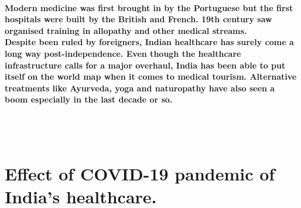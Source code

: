 \documentclass[12pt]{article}
\begin{document}
     \paragraph{   Modern medicine was first brought in by the Portuguese but the first hospitals were built by the British and French. 19th century saw organised training in allopathy and other medical streams.\\
    Despite been ruled by foreigners, Indian healthcare has surely come a long way post-independence. Even though the healthcare infrastructure calls for a major overhaul, India has been able to put itself on the world map when it comes to medical tourism. Alternative treatments like Ayurveda, yoga and naturopathy have also seen a boom especially in the last decade or so.}
 
     \\\\\section{Effect of COVID-19 pandemic of India's healthcare.}
\end{document}
